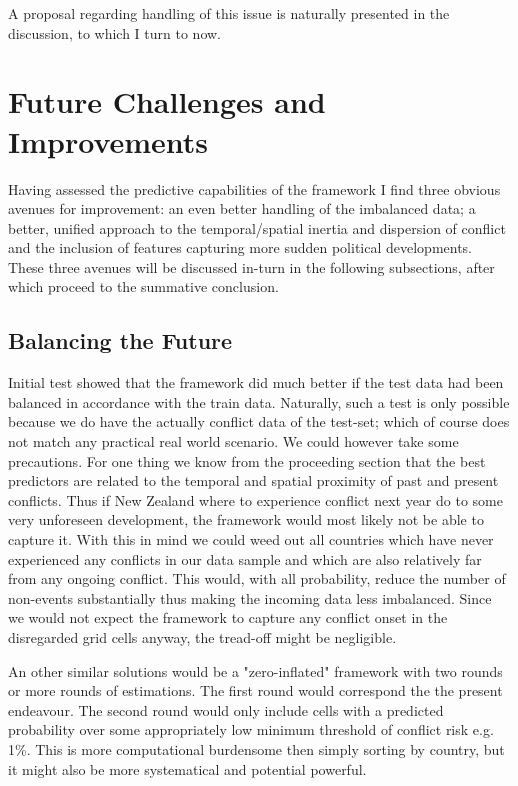 \documentclass[a4paper]{article}
\begin{document}

A proposal regarding handling of this issue is naturally presented in the discussion, to which I turn to now.\par

\section{Future Challenges and Improvements}

Having assessed the predictive capabilities of the framework I find three obvious avenues for improvement: an even better handling of the imbalanced data; a better, unified approach to the temporal/spatial inertia and dispersion of conflict and the inclusion of features capturing more sudden political developments. These three avenues will be discussed in-turn in the following subsections, after which proceed to the summative conclusion.

\subsection{Balancing the Future}
Initial test showed that the framework did much better if the test data had been balanced in accordance with the train data. Naturally, such a test is only possible because we do have the actually conflict data of the test-set; which of course does not match any practical real world scenario. We could however take some precautions. For one thing we know from the proceeding section that the best predictors are related to the temporal and spatial proximity of past and present conflicts. Thus if New Zealand where to experience conflict next year do to some very unforeseen development, the framework would most likely not be able to capture it. With this in mind we could weed out all countries which have never experienced any conflicts in our data sample and which are also relatively far from any ongoing conflict. This would, with all probability, reduce the number of non-events substantially thus making the incoming data less imbalanced. Since we would not expect the framework to capture any conflict onset in the disregarded grid cells anyway, the tread-off might be negligible.\par

An other similar solutions would be a "zero-inflated" framework with two rounds or more rounds of estimations. The first round would correspond the the present endeavour. The second round would only include cells with a predicted probability over some appropriately low minimum threshold of conflict risk e.g. 1\%. This is more computational burdensome then simply sorting by country, but it might also be more systematical and potential powerful.\par  
\end{document}
